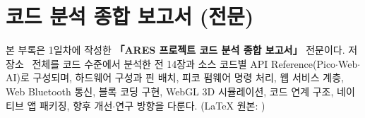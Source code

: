 \chapter{코드 분석 종합 보고서 (전문)}
\label{app:code}

본 부록은 1일차에 작성한 \textbf{「ARES 프로젝트 코드 분석 종합 보고서」} 전문이다.
저장소~\cite{ares-repo} 전체를 코드 수준에서 분석한 전 14장과 소스 코드별
API Reference(Pico$\cdot$Web$\cdot$AI)로 구성되며, 하드웨어 구성과 핀 배치, 피코 펌웨어
명령 처리, 웹 서비스 계층, Web Bluetooth 통신, 블록 코딩 구현, WebGL 3D 시뮬레이션,
코드 연계 구조, 네이티브 앱 패키징, 향후 개선$\cdot$연구 방향을 다룬다. (LaTeX 원본:
)

\medskip
\begingroup

















\endgroup
